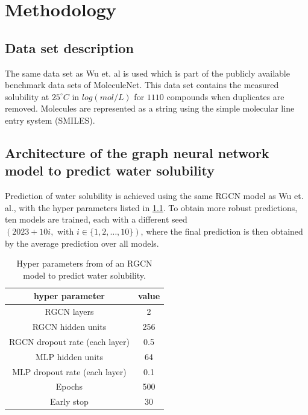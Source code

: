 \chapter{Methodology}


\section{Data set description}

The same data set as Wu et. al is used which is part of the publicly available 
benchmark data sets of MoleculeNet.\cite{wu2018moleculenet} This data set contains 
the measured solubility at $25^{\circ} C$ in $log(mol/L)$ for $1110$ compounds when duplicates 
are removed. Molecules are represented as a string using the simple molecular 
line entry system \big(SMILES\big).\cite{weininger1988smiles} 





\section{Architecture of the graph neural network model to predict water solubility}


Prediction of water solubility is achieved using the same RGCN model as Wu et. al.,
with the hyper parameters listed in \cref{tab:hyperparameters}. To obtain more 
robust predictions, ten models are trained, each with a different seed 
$(2023 + 10i, \text{ with } i \in \{1, 2, \dots, 10\})$, where the final 
prediction is then obtained by the average prediction over all models.


\begin{table}[h]
    \caption{ Hyper parameters from \protect{} of an RGCN model to predict water solubility.}
    \label{tab:hyperparameters}
    \begin{center}
        \begin{tabular}{cc}
            \toprule
            \textbf{hyper parameter} & \textbf{value} \\
            \midrule
            RGCN layers & 2 \\
            RGCN hidden units & 256 \\
            RGCN dropout rate (each layer) & 0.5 \\
            MLP hidden units & 64 \\
            MLP dropout rate (each layer) & 0.1 \\ 
            Epochs & 500 \\
            Early stop & 30 \\
            \bottomrule
        \end{tabular}
    \end{center}
\end{table}


